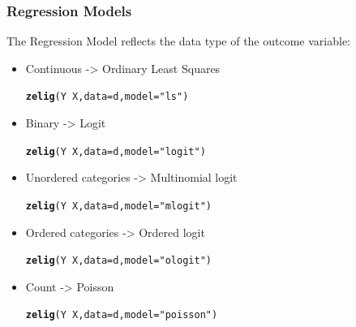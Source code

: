 \documentclass[xcolor=x11names,compress]{beamer}\usepackage[]{graphicx}\usepackage[]{color}
\makeatletter
\newcommand{\hlstr}[1]{\textcolor[rgb]{0.192,0.494,0.8}{#1}}%
\newcommand{\hlopt}[1]{\textcolor[rgb]{0,0,0}{#1}}%
\newcommand{\hlstd}[1]{\textcolor[rgb]{0.345,0.345,0.345}{#1}}%
\newcommand{\hlkwc}[1]{\textcolor[rgb]{0.333,0.667,0.333}{#1}}%
\newcommand{\hlkwd}[1]{\textcolor[rgb]{0.737,0.353,0.396}{\textbf{#1}}}%
\newenvironment{kframe}{%
 \def\at@end@of@kframe{}%
 \ifinner\ifhmode%
  \def\at@end@of@kframe{\end{minipage}}%
  \begin{minipage}{\columnwidth}%
 \fi\fi%
 \def\FrameCommand##1{\hskip\@totalleftmargin \hskip-\fboxsep
 \colorbox{shadecolor}{##1}\hskip-\fboxsep
     \hskip-\linewidth \hskip-\@totalleftmargin \hskip\columnwidth}%
 \MakeFramed {\advance\hsize-\width
   \@totalleftmargin\z@ \linewidth\hsize
   \@setminipage}}%
 {\par\unskip\endMakeFramed%
 \at@end@of@kframe}
\newenvironment{knitrout}{}{} %
\renewcommand{\(}{\begin{columns}}
\renewcommand{\)}{\end{columns}}
\newcommand{\<}[1]{\begin{column}{#1}}
\renewcommand{\>}{\end{column}}
\makeatother
\begin{document}
\begin{frame}
\frametitle{Regression Models}
The Regression Model reflects the data type of the outcome variable:
\begin{itemize}
\item Continuous -> Ordinary Least Squares  
\begin{knitrout}
\color{fgcolor}\begin{kframe}
\begin{alltt}
\hlkwd{zelig}\hlstd{(Y} \hlopt{~} \hlstd{X,}\hlkwc{data}\hlstd{=d,}\hlkwc{model}\hlstd{=}\hlstr{"ls"}\hlstd{)}
\end{alltt}
\end{kframe}
\end{knitrout}
\item Binary -> Logit  
\begin{knitrout}
\color{fgcolor}\begin{kframe}
\begin{alltt}
\hlkwd{zelig}\hlstd{(Y} \hlopt{~} \hlstd{X,}\hlkwc{data}\hlstd{=d,}\hlkwc{model}\hlstd{=}\hlstr{"logit"}\hlstd{)}
\end{alltt}
\end{kframe}
\end{knitrout}
\item Unordered categories -> Multinomial logit  
\begin{knitrout}
\color{fgcolor}\begin{kframe}
\begin{alltt}
\hlkwd{zelig}\hlstd{(Y} \hlopt{~} \hlstd{X,}\hlkwc{data}\hlstd{=d,}\hlkwc{model}\hlstd{=}\hlstr{"mlogit"}\hlstd{)}
\end{alltt}
\end{kframe}
\end{knitrout}
\item Ordered categories -> Ordered logit  
\begin{knitrout}
\color{fgcolor}\begin{kframe}
\begin{alltt}
\hlkwd{zelig}\hlstd{(Y} \hlopt{~} \hlstd{X,}\hlkwc{data}\hlstd{=d,}\hlkwc{model}\hlstd{=}\hlstr{"ologit"}\hlstd{)}
\end{alltt}
\end{kframe}
\end{knitrout}
\item Count -> Poisson  
\begin{knitrout}
\color{fgcolor}\begin{kframe}
\begin{alltt}
\hlkwd{zelig}\hlstd{(Y} \hlopt{~} \hlstd{X,}\hlkwc{data}\hlstd{=d,}\hlkwc{model}\hlstd{=}\hlstr{"poisson"}\hlstd{)}
\end{alltt}
\end{kframe}
\end{knitrout}
\end{itemize}
\end{frame}
\end{document}
